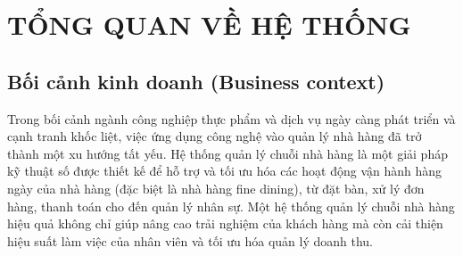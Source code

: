 \section{TỔNG QUAN VỀ HỆ THỐNG}

\subsection{Bối cảnh kinh doanh (Business context)}
Trong bối cảnh ngành công nghiệp thực phẩm và dịch vụ ngày càng phát triển và cạnh tranh khốc liệt, việc ứng dụng công nghệ vào quản lý nhà hàng đã trở thành một xu hướng tất yếu. Hệ thống quản lý chuỗi nhà hàng là một giải pháp kỹ thuật số được thiết kế để hỗ trợ và tối ưu hóa các hoạt động vận hành hàng ngày của nhà hàng (đặc biệt là nhà hàng fine dining), từ đặt bàn, xử lý đơn hàng, thanh toán cho đến quản lý nhân sự. Một hệ thống quản lý chuỗi nhà hàng hiệu quả không chỉ giúp nâng cao trải nghiệm của khách hàng mà còn cải thiện hiệu suất làm việc của nhân viên và tối ưu hóa quản lý doanh thu.


